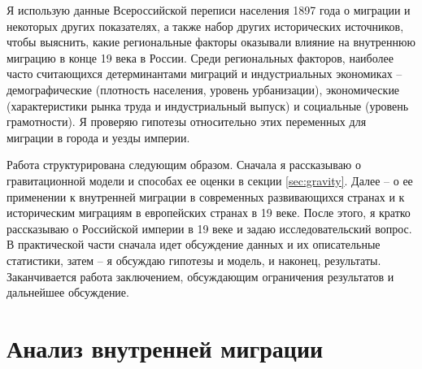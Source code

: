 \documentclass[a4paper,12pt]{article}
\let\oldsection\section
\renewcommand\section{\clearpage\oldsection}
\begin{document}
Я использую данные Всероссийской переписи населения 1897 года \citep{census_1897} о миграции и некоторых других показателях, а также набор других исторических источников, чтобы выяснить, какие региональные факторы оказывали влияние на внутреннюю миграцию в конце 19 века в России. Среди региональных факторов, наиболее часто считающихся детерминантами миграций и индустриальных экономиках -- демографические (плотность населения, уровень урбанизации), экономические (характеристики рынка труда и индустриальный выпуск) и социальные (уровень грамотности). Я проверяю гипотезы относительно этих переменных для миграции в города и уезды империи.

Работа структурирована следующим образом. Сначала я рассказываю о гравитационной модели и способах ее оценки в секции \ref{sec:gravity}. Далее -- о ее применении к внутренней миграции в современных развивающихся странах и к историческим миграциям в европейских странах в 19 веке. После этого, я кратко рассказываю о Российской империи в 19 веке и задаю исследовательский вопрос. В практической части сначала идет обсуждение данных и их описательные статистики, затем -- я обсуждаю гипотезы и модель, и наконец, результаты. Заканчивается работа заключением, обсуждающим ограничения результатов и дальнейшее обсуждение.

\section{Анализ внутренней миграции}
\end{document}
